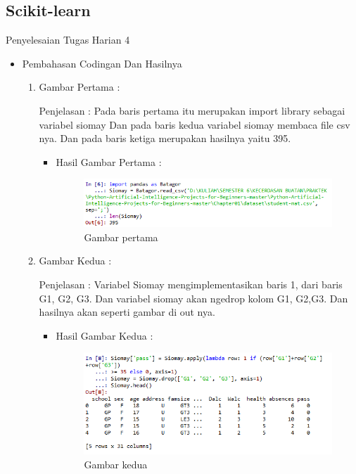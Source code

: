 \subsection{Scikit-learn}
Penyelesaian Tugas Harian 4 
\begin{itemize}
\item Pembahasan Codingan Dan Hasilnya
\begin{enumerate}
\item Gambar Pertama :
\par Penjelasan : Pada baris pertama itu merupakan import library sebagai variabel siomay  Dan pada baris kedua variabel siomay membaca file csv nya. Dan pada baris ketiga merupakan hasilnya yaitu 395.

\par
\begin{itemize}
\par
\item Hasil  Gambar Pertama :
\par

\begin{figure}[ht]
\centering
\includegraphics[scale=0.6]{figures/AIP/jd1.PNG}
\caption{ Gambar pertama}
\label{1}
\end{figure}

\par
\end{itemize}
\item  Gambar Kedua :
\par Penjelasan : Variabel Siomay mengimplementasikan baris 1, dari baris G1, G2, G3. Dan variabel siomay akan ngedrop kolom G1, G2,G3. Dan hasilnya akan seperti gambar di out nya.
\par 
\begin{itemize}
\par
\item Hasil Gambar Kedua :

\begin{figure}[ht]
\centering
\includegraphics[scale=0.7]{figures/AIP/jd2.PNG}
\caption{Gambar kedua}
\label{2}
\end{figure}


\end{itemize}
\end{enumerate}
\end{itemize}
